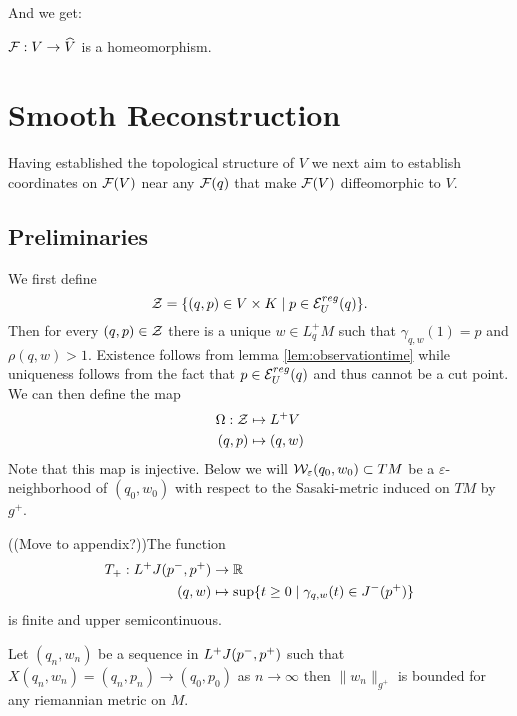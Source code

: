 And we get:
\begin{corollary}
    $\mathcal{F}:V\to \widehat{V}$ is a homeomorphism.
\end{corollary}


\section{Smooth Reconstruction}
Having established the topological structure of $V$ we next aim to establish coordinates on $\mathcal{F}(V)$ near any $\mathcal{F}(q)$ that make $\mathcal{F}(V)$ diffeomorphic to $V$.

\subsection{Preliminaries}

\begin{definition}[Coordinates on $V$]
We first define 
\[
    \mathcal{Z} = \{(q,p)\in V\times K \mid p\in \mathcal{E}_U^{reg}(q)\}.
\] 
Then for every $(q,p)\in \mathcal{Z}$ there is a unique $w\in L^+_qM$ such that $\gamma_{q,w}(1)=p$ and $\rho(q,w)>1$. Existence follows from lemma \ref{lem:observationtime} while uniqueness follows from the fact that $p\in \mathcal{E}_U^{reg}(q)$ and thus cannot be a cut point. 
We can then define the map
\begin{align*}
    \Omega:\mathcal{Z}&\mapsto L^+V\\
    (q,p)&\mapsto (q,w)
\end{align*}
Note that this map is injective.
Below we will $\mathcal{W}_\varepsilon(q_0,w_0)\subset TM$ be a $\varepsilon$-neighborhood of $(q_0,w_0)$ with respect to the Sasaki-metric induced on $TM$ by $g^+$.
\end{definition}

\begin{lemma}((Move to appendix?))The function
    \begin{align*}
        T_+:L^+J(p^-,p^+)&\to \mathbb{R} \\
        (q,w)&\mapsto \sup \{ t\ge 0 \mid \gamma_{q,w}(t)\in J^-(p^+)\}
    \end{align*}
    is finite and upper semicontinuous.
\end{lemma}
\begin{corollary}
    Let $(q_n,w_n)$ be a sequence in $L^+J(p^-,p^+)$ such that $X(q_n,w_n)=(q_n,p_n)\to (q_0,p_0)$ as $n\to \infty$ then $\lVert w_n \rVert_{g^+}$ is bounded for any riemannian metric on $M$.
\end{corollary}

